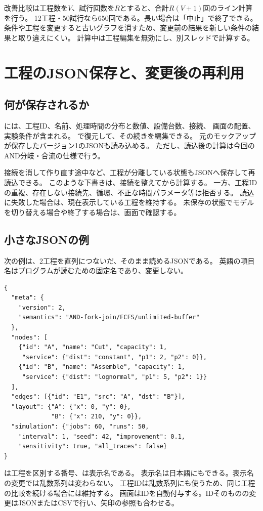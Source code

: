 \documentclass[a4paper,11pt]{ltjsarticle}
\DeclareRobustCommand{\code}[1]{\texttt{\detokenize{#1}}}
\begin{document}
改善比較は工程数を$V$、試行回数を$R$とすると、合計$R(V+1)$回のライン計算を行う。
12工程・50試行なら650回である。長い場合は「中止」で終了できる。
条件や工程を変更すると古いグラフを消すため、変更前の結果を新しい条件の結果と取り違えにくい。
計算中は工程編集を無効にし、別スレッドで計算する。

\clearpage
\section{工程のJSON保存と、変更後の再利用}
\subsection{何が保存されるか}
\code{JSON保存}には、工程ID、名前、処理時間の分布と数値、設備台数、接続、
画面の配置、実験条件が含まれる。
\code{JSON読込}で復元して、その続きを編集できる。
元のモックアップが保存したバージョン1のJSONも読み込める。
ただし、読込後の計算は今回のAND分岐・合流の仕様で行う。

接続を消して作り直す途中など、工程が分離している状態もJSONへ保存して再読込できる。
このような下書きは、接続を整えてから計算する。
一方、工程IDの重複、存在しない接続先、循環、不正な時間パラメータ等は拒否する。
読込に失敗した場合は、現在表示している工程を維持する。
未保存の状態でモデルを切り替える場合や終了する場合は、画面で確認する。

\subsection{小さなJSONの例}
次の例は、2工程を直列につないだ、そのまま読めるJSONである。
英語の項目名はプログラムが読むための固定名であり、変更しない。
\par\noindent\begin{minipage}{\linewidth}
\begin{lstlisting}
{
  "meta": {
    "version": 2,
    "semantics": "AND-fork-join/FCFS/unlimited-buffer"
  },
  "nodes": [
    {"id": "A", "name": "Cut", "capacity": 1,
     "service": {"dist": "constant", "p1": 2, "p2": 0}},
    {"id": "B", "name": "Assemble", "capacity": 1,
     "service": {"dist": "lognormal", "p1": 5, "p2": 1}}
  ],
  "edges": [{"id": "E1", "src": "A", "dst": "B"}],
  "layout": {"A": {"x": 0, "y": 0},
             "B": {"x": 210, "y": 0}},
  "simulation": {"jobs": 60, "runs": 50,
    "interval": 1, "seed": 42, "improvement": 0.1,
    "sensitivity": true, "all_traces": false}
}
\end{lstlisting}
\end{minipage}\par
\code{id}は工程を区別する番号、\code{name}は表示名である。
表示名は日本語にもできる。表示名の変更では乱数系列は変わらない。
工程IDは乱数系列にも使うため、同じ工程の比較を続ける場合には維持する。
画面はIDを自動付与する。IDそのものの変更はJSONまたはCSVで行い、矢印の参照も合わせる。
\end{document}

